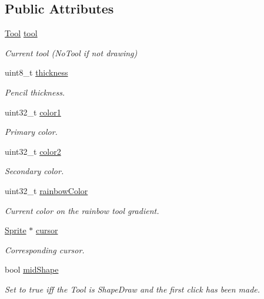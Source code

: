 \subsection*{Public Attributes}
\begin{DoxyCompactItemize}
\item 
\mbox{\hyperlink{group__game__state_ga8cdac3f25ed2be17d210ff50defe0791}{Tool}} \mbox{\hyperlink{group__game__state_ga1e98afd819bebaa1b6bd24c689d870a7}{tool}}
\begin{DoxyCompactList}\small\item\em Current tool (No\+Tool if not drawing) \end{DoxyCompactList}\item 
uint8\+\_\+t \mbox{\hyperlink{group__game__state_ga10ed53265f325368bdc3bea0fd0f7e92}{thickness}}
\begin{DoxyCompactList}\small\item\em Pencil thickness. \end{DoxyCompactList}\item 
uint32\+\_\+t \mbox{\hyperlink{group__game__state_gaad6324a79966f9966c4f45b6f8db1439}{color1}}
\begin{DoxyCompactList}\small\item\em Primary color. \end{DoxyCompactList}\item 
uint32\+\_\+t \mbox{\hyperlink{group__game__state_ga2b3f5a1ab34c67d534cb90afa8caf6dd}{color2}}
\begin{DoxyCompactList}\small\item\em Secondary color. \end{DoxyCompactList}\item 
uint32\+\_\+t \mbox{\hyperlink{group__game__state_ga77b100fecc69cfce99634262258a2510}{rainbow\+Color}}
\begin{DoxyCompactList}\small\item\em Current color on the rainbow tool gradient. \end{DoxyCompactList}\item 
\mbox{\hyperlink{struct_sprite}{Sprite}} $\ast$ \mbox{\hyperlink{group__game__state_gaf04f059f3cb2049366c3ef91d0ea4ce9}{cursor}}
\begin{DoxyCompactList}\small\item\em Corresponding cursor. \end{DoxyCompactList}\item 
bool \mbox{\hyperlink{group__game__state_ga62e90a0c5f0cacba70d03d78d1bb3393}{mid\+Shape}}
\begin{DoxyCompactList}\small\item\em Set to true iff the Tool is Shape\+Draw and the first click has been made. \end{DoxyCompactList}\item 

\end{DoxyCompactItemize}
